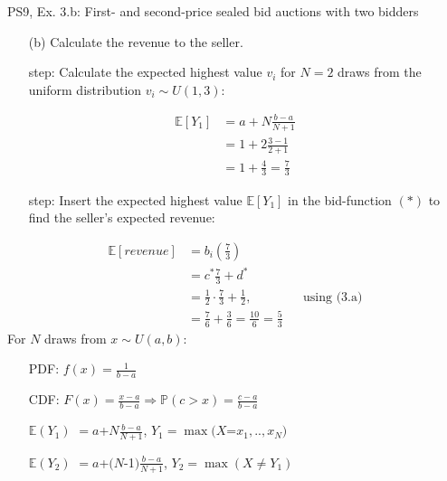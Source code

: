 \begin{frame}{PS9, Ex. 3.b: First- and second-price sealed bid auctions with two bidders}
    \begin{multicols}{2}
      \begin{itemize}
        \item[(b)] Calculate the revenue to the seller.
        \item[\nth{1} step:] Calculate the expected highest value $v_i$ for $N=2$ draws from the uniform distribution $v_i\sim U(1,3)$:
      \end{itemize}
      \vspace{-8pt}
      \begin{align*}
        \mathbb{E}[Y_1]&=a+N\frac{b-a}{N+1}\\
                       &=1+2\frac{3-1}{2+1}\\
                       &=1+\frac{4}{3}=\frac{7}{3}
      \end{align*}
      \vspace{-12pt}
      \begin{itemize}
        \item[\nth{2} step:] Insert the expected highest value $\mathbb{E}[Y_1]$ in the bid-function $(*)$  to find the seller's expected revenue:
      \end{itemize}
      \vspace{-8pt}
      \begin{align*}
        \mathbb{E}[revenue]&=b_i\left(\frac{7}{3}\right)\\
                           &= c^*\frac{7}{3}+d^*\\
                           &= \frac{1}{2}\cdot\frac{7}{3}+\frac{1}{2},&&\text{using (3.a)}\\
                           &= \frac{7}{6}+\frac{3}{6}=\frac{10}{6}=\frac{5}{3}
      \end{align*}
      \vfill\null\columnbreak
      For $N$ draws from $x\sim U(a, b):$
      \vspace{-6pt}
      \begin{enumerate}
        \item[PDF:] $f(x)=\frac{1}{b-a}$
        \item[CDF:] $F(x)=\frac{x-a}{b-a}\Rightarrow\mathbb{P}(c>x)=\frac{c-a}{b-a}$
        \item[$\mathbb{E}(Y_1)$] $=a$+$N\frac{b-a}{N+1}$, $Y_1=\max(X$=$x_1,..,x_N)$
        \item[$\mathbb{E}(Y_2)$] $=a$+$(N$-1$)\frac{b-a}{N+1}$, $Y_2=\max(X\neq Y_1)$
      \end{enumerate}

\end{multicols}
\end{frame}

